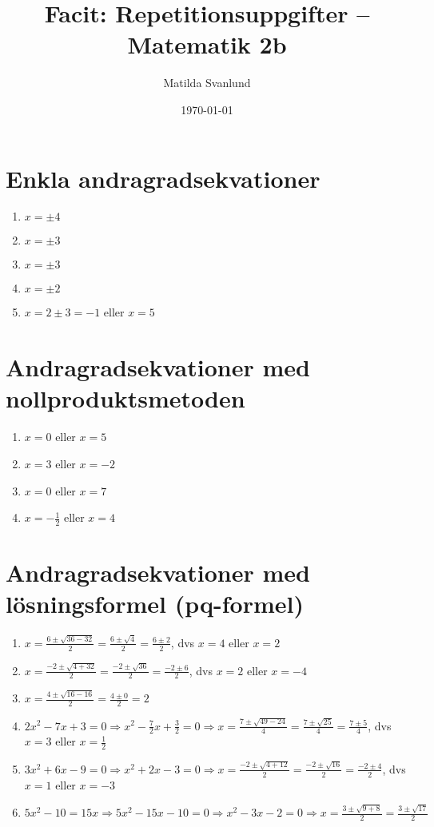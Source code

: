 \documentclass[a4paper,11pt]{article}
\title{Facit: Repetitionsuppgifter -- Matematik 2b}
\author{Matilda Svanlund}
\date{\today}
\begin{document}
\maketitle

\section{Enkla andragradsekvationer}
\begin{enumerate}[label=\textbf{\arabic*.}]
    \item $x = \pm 4$
    \item $x = \pm 3$
    \item $x = \pm 3$
    \item $x = \pm 2$
    \item $x = 2 \pm 3 = -1$ eller $x = 5$
\end{enumerate}

\section{Andragradsekvationer med nollproduktsmetoden}
\begin{enumerate}[label=\textbf{\arabic*.}]
    \item $x = 0$ eller $x = 5$
    \item $x = 3$ eller $x = -2$
    \item $x = 0$ eller $x = 7$
    \item $x = -\frac{1}{2}$ eller $x = 4$
\end{enumerate}

\section{Andragradsekvationer med lösningsformel (pq-formel)}
\begin{enumerate}[label=\textbf{\arabic*.}]
    \item $x = \frac{6 \pm \sqrt{36-32}}{2} = \frac{6 \pm \sqrt{4}}{2} = \frac{6 \pm 2}{2}$, dvs $x = 4$ eller $x = 2$
    \item $x = \frac{-2 \pm \sqrt{4+32}}{2} = \frac{-2 \pm \sqrt{36}}{2} = \frac{-2 \pm 6}{2}$, dvs $x = 2$ eller $x = -4$
    \item $x = \frac{4 \pm \sqrt{16-16}}{2} = \frac{4 \pm 0}{2} = 2$
    \item $2x^2 - 7x + 3 = 0 \Rightarrow x^2 - \frac{7}{2}x + \frac{3}{2} = 0 \Rightarrow x = \frac{7 \pm \sqrt{49-24}}{4} = \frac{7 \pm \sqrt{25}}{4} = \frac{7 \pm 5}{4}$, dvs $x = 3$ eller $x = \frac{1}{2}$
    \item $3x^2 + 6x - 9 = 0 \Rightarrow x^2 + 2x - 3 = 0 \Rightarrow x = \frac{-2 \pm \sqrt{4+12}}{2} = \frac{-2 \pm \sqrt{16}}{2} = \frac{-2 \pm 4}{2}$, dvs $x = 1$ eller $x = -3$
    \item $5x^2 - 10 = 15x \Rightarrow 5x^2 - 15x - 10 = 0 \Rightarrow x^2 - 3x - 2 = 0 \Rightarrow x = \frac{3 \pm \sqrt{9+8}}{2} = \frac{3 \pm \sqrt{17}}{2}$
\end{enumerate}
\end{document}
